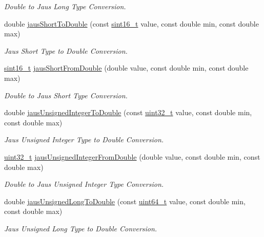 \begin{CompactItemize}
\begin{CompactList}\small\item\em Double to Jaus Long Type Conversion. \item\end{CompactList}\item 
double \hyperlink{group__data__conv_g0a3aeb6d4da64c5a56f94c711e3a35bb}{jausShortToDouble} (const \hyperlink{libdrdc_8h_5881659ed80e940350d12831204375cd}{sint16\_\-t} value, const double min, const double max)
\begin{CompactList}\small\item\em Jaus Short Type to Double Conversion. \item\end{CompactList}\item 
\hyperlink{libdrdc_8h_5881659ed80e940350d12831204375cd}{sint16\_\-t} \hyperlink{group__data__conv_g64a0bea692fa765ff51fc8a897961b6c}{jausShortFromDouble} (double value, const double min, const double max)
\begin{CompactList}\small\item\em Double to Jaus Short Type Conversion. \item\end{CompactList}\item 
double \hyperlink{group__data__conv_gedb727422eafd1cbcb9497109016314d}{jausUnsignedIntegerToDouble} (const \hyperlink{libdrdc_8h_06896e8c53f721507066c079052171f8}{uint32\_\-t} value, const double min, const double max)
\begin{CompactList}\small\item\em Jaus Unsigned Integer Type to Double Conversion. \item\end{CompactList}\item 
\hyperlink{libdrdc_8h_06896e8c53f721507066c079052171f8}{uint32\_\-t} \hyperlink{group__data__conv_g4316bdd79d655a1ac80c1263ffd324cb}{jausUnsignedIntegerFromDouble} (double value, const double min, const double max)
\begin{CompactList}\small\item\em Double to Jaus Unsigned Integer Type Conversion. \item\end{CompactList}\item 
double \hyperlink{group__data__conv_g778c5ff4cb41a0ba9464a721bd14ef57}{jausUnsignedLongToDouble} (const \hyperlink{libdrdc_8h_aa5d1cd013383c889537491c3cfd9aad}{uint64\_\-t} value, const double min, const double max)
\begin{CompactList}\small\item\em Jaus Unsigned Long Type to Double Conversion. \item\end{CompactList}\item 

\end{CompactItemize}
